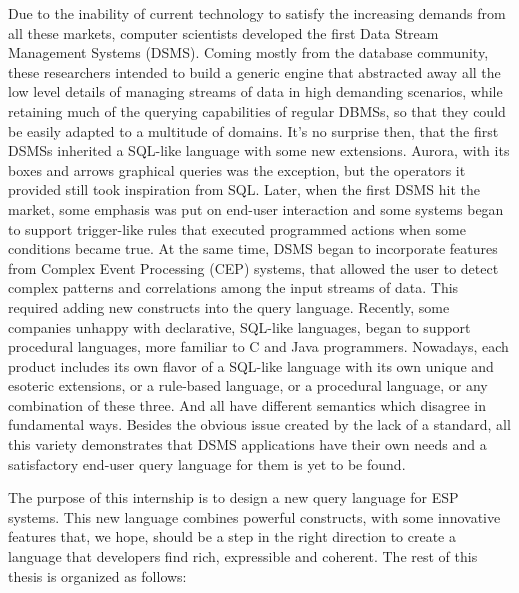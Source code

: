 \documentclass[twoside]{report}
\begin{document}
Due to the inability of current technology to satisfy the increasing demands from all these markets, computer scientists developed the first Data Stream Management Systems (DSMS). Coming mostly from the database community, these researchers intended to build a generic engine that abstracted away all the low level details of managing streams of data in high demanding scenarios, while retaining much of the querying capabilities of regular DBMSs, so that they could be easily adapted to a multitude of domains. It's no surprise then, that the first DSMSs inherited a SQL-like language with some new extensions. Aurora, with its boxes and arrows graphical queries was the exception, but the operators it provided still took inspiration from SQL. Later, when the first DSMS hit the market, some emphasis was put on end-user interaction and some systems began to support trigger-like rules that executed programmed actions when some conditions became true. At the same time, DSMS began to incorporate features from Complex Event Processing (CEP) systems, that allowed the user to detect complex patterns and correlations among the input streams of data. This required adding new constructs into the query language. Recently, some companies unhappy with declarative, SQL-like languages, began to support procedural languages, more familiar to C and Java programmers. Nowadays, each product includes its own flavor of a SQL-like language with its own unique and esoteric extensions, or a rule-based language, or a procedural language, or any combination of these three. And all have different semantics which disagree in fundamental ways. Besides the obvious issue created by the lack of a standard, all this variety demonstrates that DSMS applications have their own needs and a satisfactory end-user query language for them is yet to be found.

The purpose of this internship is to design a new query language for ESP systems. This new language combines powerful constructs, with some innovative features that, we hope, should be a step in the right direction to create a language that developers find rich, expressible and coherent. The rest of this thesis is organized as follows:
\end{document}
